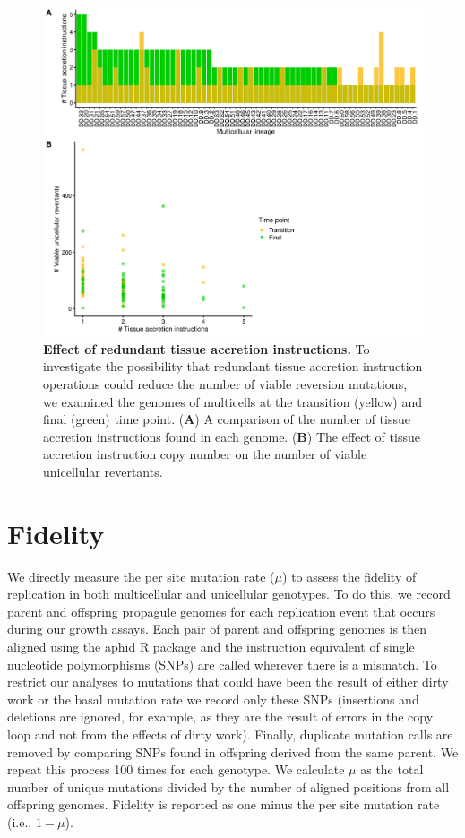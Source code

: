 \documentclass[
]{book}
\begin{document}
\begin{figure}
\centering
\includegraphics{images/Redundant_tissue_accretion_operations_23DEC22.png}
\caption{\label{fig:redundant-tissue-accretion-instructions}\textbf{Effect of redundant tissue accretion instructions.} To investigate the possibility that redundant tissue accretion instruction operations could reduce the number of viable reversion mutations, we examined the genomes of multicells at the transition (yellow) and final (green) time point. (\textbf{A}) A comparison of the number of tissue accretion instructions found in each genome. (\textbf{B}) The effect of tissue accretion instruction copy number on the number of viable unicellular revertants.}
\end{figure}

\hypertarget{fidelity}{%
\section{Fidelity}\label{fidelity}}

We directly measure the per site mutation rate (\(\mu\)) to assess the fidelity of replication in both multicellular and unicellular genotypes. To do this, we record parent and offspring propagule genomes for each replication event that occurs during our growth assays. Each pair of parent and offspring genomes is then aligned using the aphid R package \citep{aphid} and the instruction equivalent of single nucleotide polymorphisms (SNPs) are called wherever there is a mismatch. To restrict our analyses to mutations that could have been the result of either dirty work or the basal mutation rate we record only these SNPs (insertions and deletions are ignored, for example, as they are the result of errors in the copy loop and not from the effects of dirty work). Finally, duplicate mutation calls are removed by comparing SNPs found in offspring derived from the same parent. We repeat this process 100 times for each genotype. We calculate \(\mu\) as the total number of unique mutations divided by the number of aligned positions from all offspring genomes. Fidelity is reported as one minus the per site mutation rate (i.e., \(1 - \mu\)).
\end{document}
